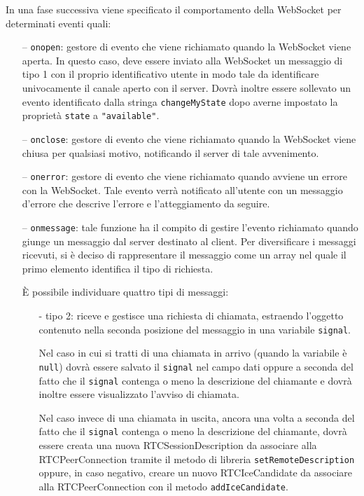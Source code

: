 \begin{description}
  In una fase successiva viene specificato il comportamento della WebSocket per determinati eventi quali:
  \begin{itemize}
    \item[--] \texttt{onopen}: gestore di evento che viene richiamato quando la WebSocket viene aperta. In questo caso, deve essere inviato alla WebSocket un messaggio di tipo  1 con il proprio identificativo utente in modo tale da identificare univocamente il canale aperto con il server. Dovrà inoltre essere sollevato un evento identificato dalla stringa \verb'changeMyState' dopo averne impostato la proprietà \verb'state' a \verb'"available"'.
    \item[--] \texttt{onclose}: gestore di evento che viene richiamato quando la WebSocket viene chiusa per qualsiasi motivo, notificando il server di tale avvenimento.
    \item[--] \texttt{onerror}: gestore di evento che viene richiamato quando avviene un errore con la WebSocket. Tale evento verrà notificato all'utente con un messaggio d'errore che descrive l'errore e l'atteggiamento da seguire.
    \item[--] \texttt{onmessage}: tale funzione ha il compito di gestire l'evento richiamato quando giunge un messaggio dal server destinato al client. Per diversificare i messaggi ricevuti, si è deciso di rappresentare il messaggio come un array nel quale il primo elemento identifica il tipo di richiesta.
    
    È possibile individuare quattro tipi di messaggi:
    \begin{itemize}
      \item[-] tipo 2: riceve e gestisce una richiesta di chiamata, estraendo l'oggetto contenuto nella seconda posizione del messaggio in una variabile \verb'signal'.
      
      Nel caso in cui si tratti di una chiamata in arrivo (quando la variabile  è \verb'null') dovrà essere salvato il \verb'signal' nel campo dati  oppure  a seconda del fatto che il \verb'signal' contenga o meno la descrizione del  chiamante e dovrà inoltre essere visualizzato l'avviso di chiamata.
      
      Nel caso invece di una chiamata in uscita, ancora una volta a seconda del fatto che il \verb'signal' contenga o meno la descrizione del  chiamante, dovrà essere creata una nuova RTCSessionDescription da associare alla RTCPeerConnection tramite il metodo di libreria \verb'setRemoteDescription' oppure, in caso negativo, creare un nuovo RTCIceCandidate da associare alla RTCPeerConnection con il metodo \verb'addIceCandidate'.


\end{itemize}
\end{itemize}
\end{description}
